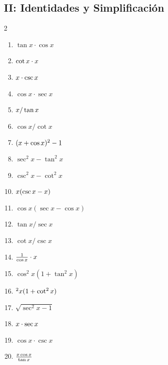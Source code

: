 \documentclass[letterpaper, 12pt]{article}
\let\sin\relax
\DeclareMathOperator{\sin}{sen}
\begin{document}
\subsection*{II: Identidades y Simplificación}
\begin{multicols}{2}
\begin{enumerate}[label=\textbf{\arabic*.}, start=21]
    \item $\tan x \cdot \cos x$
    \item $\cot x \cdot \sin x$
    \item $\sin x \cdot \csc x$
    \item $\cos x \cdot \sec x$
    \item $\sin x / \tan x$
    \item $\cos x / \cot x$
    \item $(\sin x + \cos x)^2 - 1$
    \item $\sec^2 x - \tan^2 x$
    \item $\csc^2 x - \cot^2 x$
    \item $\sin x (\csc x - \sin x)$
    \item $\cos x (\sec x - \cos x)$
    \item $\tan x / \sec x$
    \item $\cot x / \csc x$
    \item $\frac{1}{\cos x} \cdot \sin x$
    \item $\cos^2 x (1 + \tan^2 x)$
    \item $\sin^2 x (1 + \cot^2 x)$
    \item $\sqrt{\sec^2 x - 1}$
    \item $\sin x \cdot \sec x$
    \item $\cos x \cdot \csc x$
    \item $\frac{\sin x \cos x}{\tan x}$
\end{enumerate}
\end{multicols}
\end{document}
